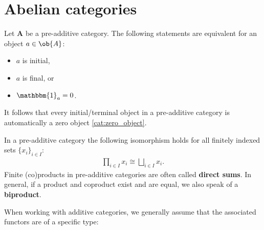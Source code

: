 \section{Abelian categories}\label{section:abelian_categories}


    \begin{property}
        Let $\mathbf{A}$ be a pre-additive category. The following statements are equivalent for an object $a\in\ob{A}$:
        \begin{itemize}
            \item $a$ is initial,
            \item $a$ is final, or
            \item $\mathbbm{1}_a = 0$.
        \end{itemize}
        It follows that every initial/terminal object in a pre-additive category is automatically a zero object \ref{cat:zero_object}.
    \end{property}
    \begin{property}[Biproducts]
        In a pre-additive category the following isomorphism holds for all finitely indexed sets $\{x_i\}_{i\in I}$:
        \begin{gather}
            \prod_{i\in I}x_i \cong \bigsqcup_{i\in I}x_i.
        \end{gather}
        Finite (co)products in pre-additive categories are often called \textbf{direct sums}. In general, if a product and coproduct exist and are equal, we also speak of a \textbf{biproduct}.
    \end{property}


    When working with additive categories, we generally assume that the associated functors are of a specific type:

